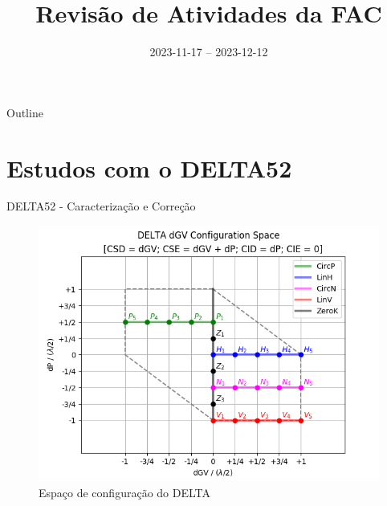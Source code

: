 \documentclass{beamer}					  %
\title{Revisão de Atividades da FAC}	%
\institute{LNLS.DAC.FAC}				%
\date{2023-11-17 -- 2023-12-12}			%
\begin{document}
\begin{frame}
  \titlepage
  \href{https://github.com/lnls-fac/doc-review-dac-fac}{}
  \href{https://www.overleaf.com/read/sbdjxtzfchrm}{}
\end{frame}

\begin{frame}{Outline}
  \tableofcontents
\end{frame}



\section{Estudos com o DELTA52}

\begin{frame}{DELTA52 - Caracterização e Correção}
    \begin{figure}[H]
    		\centering
            \includegraphics[width=.8\textwidth]{2023-12-12/figures/id-delta-dgv-config-space.png}
            \caption{Espaço de configuração do DELTA}
            \label{fig:delta-config-space}
    \end{figure}
\end{frame}
\end{document}

